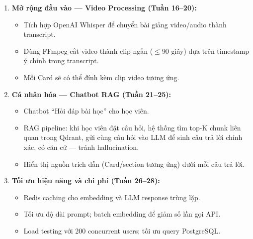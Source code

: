 \begin{enumerate}
    \item \textbf{Mở rộng đầu vào --- Video Processing (Tuần 16--20):}
    \begin{itemize}
        \item Tích hợp OpenAI Whisper để chuyển bài giảng video/audio thành
              transcript.
        \item Dùng FFmpeg cắt video thành clip ngắn ($\leq$90 giây) dựa trên
              timestamp ý chính trong transcript.
        \item Mỗi Card sẽ có thể đính kèm clip video tương ứng.
    \end{itemize}

    \item \textbf{Cá nhân hóa --- Chatbot RAG (Tuần 21--25):}
    \begin{itemize}
        \item Chatbot ``Hỏi đáp bài học'' cho học viên.
        \item RAG pipeline: khi học viên đặt câu hỏi, hệ thống tìm top-K
              chunk liên quan trong Qdrant, gửi cùng câu hỏi vào LLM để
              sinh câu trả lời chính xác, có căn cứ --- tránh hallucination.
        \item Hiển thị nguồn trích dẫn (Card/section tương ứng) dưới mỗi
              câu trả lời.
    \end{itemize}

    \item \textbf{Tối ưu hiệu năng và chi phí (Tuần 26--28):}
    \begin{itemize}
        \item Redis caching cho embedding và LLM response trùng lặp.
        \item Tối ưu độ dài prompt; batch embedding để giảm số lần gọi API.
        \item Load testing với 200 concurrent users; tối ưu query PostgreSQL.
    \end{itemize}
\end{enumerate}
